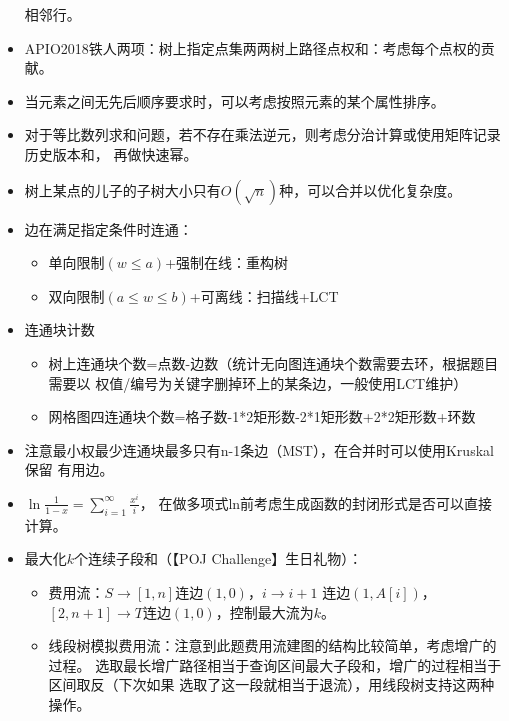 \begin{itemize}
	相邻行。
	\item APIO2018铁人两项：树上指定点集两两树上路径点权和：考虑每个点权的贡献。
	\item 当元素之间无先后顺序要求时，可以考虑按照元素的某个属性排序。
	\item 对于等比数列求和问题，若不存在乘法逆元，则考虑分治计算或使用矩阵记录历史版本和，
	再做快速幂。
	\item 树上某点的儿子的子树大小只有$O(\sqrt{n})$种，可以合并以优化复杂度。
	\item 边在满足指定条件时连通：
	\begin{itemize}
		\item 单向限制$(w\leq a)$+强制在线：重构树
		\item 双向限制$(a\leq w \leq b)$+可离线：扫描线+LCT
	\end{itemize}
	\item 连通块计数
	\begin{itemize}
		\item 树上连通块个数=点数-边数（统计无向图连通块个数需要去环，根据题目需要以
		权值/编号为关键字删掉环上的某条边，一般使用LCT维护）
		\item 网格图四连通块个数=格子数-1*2矩形数-2*1矩形数+2*2矩形数+环数
	\end{itemize}
	\item 注意最小权最少连通块最多只有n-1条边（MST），在合并时可以使用Kruskal保留
	有用边。
	\item $\ln \frac{1}{1-x}=\displaystyle \sum_{i=1}^\infty{\frac{x^i}{i}}$，
	在做多项式ln前考虑生成函数的封闭形式是否可以直接计算。
	\item 最大化$k$个连续子段和（【POJ Challenge】生日礼物）：
	\begin{itemize}
		\item 费用流：$S\rightarrow[1,n]$连边$(1,0)$，$i\rightarrow i+1$
		连边$(1,A[i])$，$[2,n+1]\rightarrow T$连边$(1,0)$，控制最大流为$k$。
		\item 线段树模拟费用流：注意到此题费用流建图的结构比较简单，考虑增广的过程。
		选取最长增广路径相当于查询区间最大子段和，增广的过程相当于区间取反（下次如果
		选取了这一段就相当于退流），用线段树支持这两种操作。


\end{itemize}
\end{itemize}

